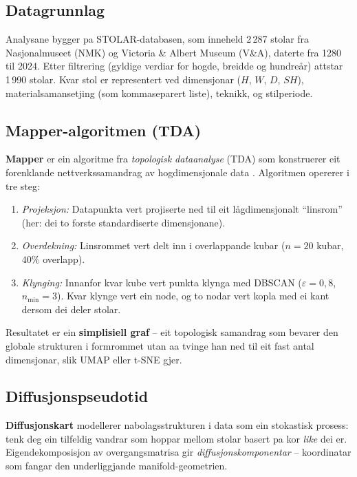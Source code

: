 \documentclass[10pt, a4paper, twocolumn]{article}
\begin{document}
\subsection{Datagrunnlag}

Analysane bygger pa STOLAR-databasen, som inneheld 2\,287 stolar fra Nasjonalmuseet (NMK) og Victoria \& Albert Museum (V\&A), daterte fra 1280 til 2024. Etter filtrering (gyldige verdiar for hogde, breidde og hundre\aa{}r) attstar 1\,990 stolar. Kvar stol er representert ved dimensjonar ($H$, $W$, $D$, $SH$), materialsamansetjing (som kommaseparert liste), teknikk, og stilperiode.

\subsection{Mapper-algoritmen (TDA)}

\textbf{Mapper} er ein algoritme fra \emph{topologisk dataanalyse} (TDA) som konstruerer eit forenklande nettverkssamandrag av hogdimensjonale data \citep{singh2007}. Algoritmen opererer i tre steg:

\begin{enumerate}[leftmargin=*, topsep=3pt, itemsep=2pt]
  \item \textit{Projeksjon:} Datapunkta vert projiserte ned til eit lågdimensjonalt ``linsrom'' (her: dei to forste standardiserte dimensjonane).
  \item \textit{Overdekning:} Linsrommet vert delt inn i overlappande kubar ($n = 20$ kubar, $40\%$ overlapp).
  \item \textit{Klynging:} Innanfor kvar kube vert punkta klynga med DBSCAN ($\varepsilon = 0{,}8$, $n_{\min} = 3$). Kvar klynge vert ein node, og to nodar vert kopla med ei kant dersom dei deler stolar.
\end{enumerate}

Resultatet er ein \textbf{simplisiell graf} -- eit topologisk samandrag som bevarer den globale strukturen i formrommet utan aa tvinge han ned til eit fast antal dimensjonar, slik UMAP eller t-SNE gjer.

\subsection{Diffusjonspseudotid}

\textbf{Diffusjonskart} \citep{coifman2006} modellerer nabolagsstruk\-turen i data som ein stokastisk prosess: tenk deg ein tilfeldig vandrar som hoppar mellom stolar basert pa kor \emph{like} dei er. Eigendekomposisjon av overgangsmatrisa gir \emph{diffusjonskomponentar} -- koordinatar som fangar den underliggjande manifold-geometrien.
\end{document}
